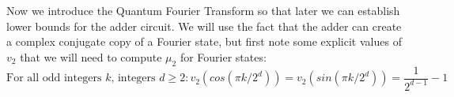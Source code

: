 \documentclass[12pt]{dalthesis}
\begin{document}
%
%
%
%


Now we introduce the Quantum Fourier Transform so that later we can establish lower bounds for the adder circuit. We will use the fact that the adder can create a complex conjugate copy of a Fourier state, but first note some explicit values of $v_2$ that we will need to compute $\mu_2$ for Fourier states:
\begin{equation}
\mbox{For all odd integers } k \mbox{, integers } d \geq 2: v_2(cos(\pi k/2^d)) = v_2(sin(\pi k /2^d)) = \frac{1}{2^{d-1}} - 1
\end{equation}
\end{document}

